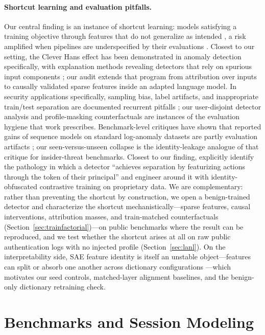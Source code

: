 \documentclass[10pt]{article} %
\begin{document}
\paragraph{Shortcut learning and evaluation pitfalls.}
Our central finding is an instance of shortcut learning: models satisfying a
training objective through features that do not generalize as intended
\citep{geirhos2020shortcut,lapuschkin2019unmasking}, a risk amplified when
pipelines are underspecified by their evaluations
\citep{damour2020underspecification}. Closest to our setting, the Clever
Hans effect has been demonstrated in anomaly detection specifically, with
explanation methods revealing detectors that rely on spurious input
components \citep{kauffmann2020clever}; our audit extends that program from
attribution over inputs to causally validated sparse features inside an
adapted language model.
In security applications specifically, sampling bias, label artifacts, and
inappropriate train/test separation are documented recurrent pitfalls
\citep{arp2022dos}; our user-disjoint detector analysis and profile-masking
counterfactuals are instances of the evaluation hygiene that work
prescribes. Benchmark-level critiques have shown that reported gains of
sequence models on standard log-anomaly datasets are partly evaluation
artifacts \citep{landauer2024critical}; our seen-versus-unseen collapse is
the identity-leakage analogue of that critique for insider-threat
benchmarks. Closest to our finding, \citet{kantchelian2024facade} explicitly identify
the pathology in which a detector ``achieves separation by featurizing
actions through the token of their principal'' and engineer around it with
identity-obfuscated contrastive training on proprietary data. We are
complementary: rather than preventing the shortcut by construction, we open
a benign-trained detector and characterize the shortcut
mechanistically---sparse features, causal interventions, attribution
masses, and train-matched counterfactuals
(Section~\ref{sec:trainfactorial})---on public benchmarks where the result
can be reproduced, and we test whether the shortcut arises at all on raw public
authentication logs with no injected profile (Section~\ref{sec:lanl}). On the interpretability side, SAE feature identity is itself an
unstable object---features can split or absorb one another across dictionary
configurations \citep{chanin2024absorption}---which motivates our seed
controls, matched-layer alignment baselines, and the benign-only dictionary
retraining check.

\section{Benchmarks and Session Modeling}
\label{sec:data}
\end{document}
